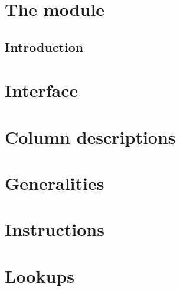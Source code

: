 
\section{The \rlpUtilsMod{} module}
\subsection{Introduction}                    \label{rlp utils: introduction}                          
\section{Interface}			     \label{rlp utils: rlp* / rlp utils interface}          
\section{Column descriptions}                \label{rlp utils: column descriptions}                   
\section{Generalities}                       \label{rlp utils: generalities}                          
\section{Instructions}                       \label{rlp utils: instructions}                          
\section{Lookups}                            \label{rlp utils: lookups}                               
